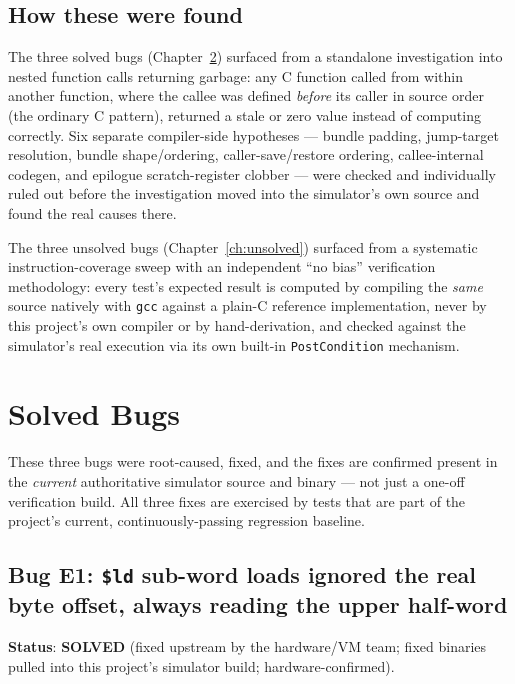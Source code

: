 \documentclass[11pt,a4paper]{report}
\begin{document}
\section{How these were found}
The three solved bugs (Chapter~\ref{ch:solved}) surfaced from a standalone investigation
into nested function calls returning garbage: any C function called from within another
function, where the callee was defined \emph{before} its caller in source order (the
ordinary C pattern), returned a stale or zero value instead of computing correctly. Six
separate compiler-side hypotheses --- bundle padding, jump-target resolution, bundle
shape/ordering, caller-save/restore ordering, callee-internal codegen, and epilogue
scratch-register clobber --- were checked and individually ruled out before the
investigation moved into the simulator's own source and found the real causes there.

The three unsolved bugs (Chapter~\ref{ch:unsolved}) surfaced from a systematic
instruction-coverage sweep with an independent ``no bias'' verification methodology: every
test's expected result is computed by compiling the \emph{same} source natively with
\texttt{gcc} against a plain-C reference implementation, never by this project's own
compiler or by hand-derivation, and checked against the simulator's real execution via its
own built-in \texttt{PostCondition} mechanism.

\chapter{Solved Bugs}
\label{ch:solved}

These three bugs were root-caused, fixed, and the fixes are confirmed present in the
\emph{current} authoritative simulator source and binary --- not just a one-off
verification build. All three fixes are exercised by tests that are part of the project's
current, continuously-passing regression baseline.

\section{Bug E1: \texttt{\$ld} sub-word loads ignored the real byte offset, always reading the upper half-word}

\textbf{Status}: \textbf{SOLVED} (fixed upstream by the hardware/VM team; fixed binaries
pulled into this project's simulator build; hardware-confirmed).
\end{document}
